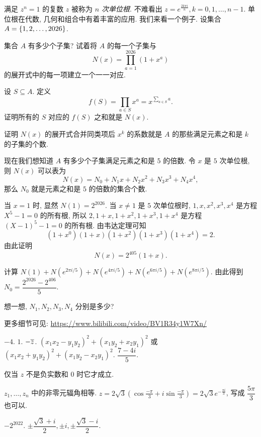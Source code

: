 \begin{homework}
    \item 满足 $z^n=1$ 的复数 $z$ 被称为 \emph{$n$ 次单位根}.
    不难看出 $z=e^{\frac{2k\pi i}n},k=0,1,\dots,n-1$.
    单位根在代数, 几何和组合中有着丰富的应用. 我们来看一个例子.
    设集合 $A={\left\{1,2,\dots,2026\right\}}$.

    \begin{exlist}
      \item 集合 $A$ 有多少个子集? 试着将 $A$ 的每一个子集与
      \[N(x)=\prod_{a=1}^{2026}(1+x^a)\]
      的展开式中的每一项建立一个一一对应.
      \item 设 $S\subseteq A$. 定义
      \[f(S)=\prod_{a\in S}x^a=x^{\sum_{a\in S}a}.\]
      证明所有的 $S$ 对应的 $f(S)$ 之和就是 $N(x)$.
      \item 证明 $N(x)$ 的展开式合并同类项后 $x^k$ 的系数就是 $A$ 的那些满足元素之和是 $k$ 的子集的个数.
      \item 现在我们想知道 $A$ 有多少个子集满足元素之和是 $5$ 的倍数.
    令 $x$ 是 $5$ 次单位根, 则 $N(x)$ 可以表为
    \[N(x)=N_0+N_1x+N_2x^2+N_3x^3+N_4x^4,\]
      那么 $N_0$ 就是元素之和是 $5$ 的倍数的集合个数.
      \item 当 $x=1$ 时, 显然 $N(1)=2^{2026}$.
      当 $x\neq 1$ 是 $5$ 次单位根时, $1,x,x^2,x^3,x^4$ 是方程 $X^5-1=0$ 的所有根, 所以 $2,1+x,1+x^2,1+x^3,1+x^4$ 是方程 $(X-1)^5-1=0$ 的所有根. 由韦达定理可知
      \[(1+x^0)(1+x)(1+x^2)(1+x^3)(1+x^4)=2.\]
      由此证明
      \[N(x)=2^{405}(1+x).\]
      \item 计算 $N(1)+N(e^{2\pi i/5})+N(e^{4\pi i/5})+N(e^{6\pi i/5})+N(e^{8\pi i/5})$. 由此得到 $N_0=\dfrac{2^{2026}-2^{406}}5$.
      \item 想一想, $N_1,N_2,N_3,N_4$ 分别是多少?
    \end{exlist}
    更多细节可见: \url{https://www.bilibili.com/video/BV1R34y1W7Xn/}
\end{homework}


\sectionExerciseAnswer

\exans $-4$.
\exans $1$.
\exans $-\overline z$.
\exans $(x_1x_2-y_1y_2)^2+(x_1y_2+x_2y_1)^2$ 或 $(x_1x_2+y_1y_2)^2+(x_1y_2-x_2y_1)^2$.
\exans $\dfrac{7-4i}5$.

\exans 仅当 $z$ 不是负实数和 $0$ 时它才成立.

\exans $z_1,\dots,z_n$ 中的非零元辐角相等.
\exans $\displaystyle z=2\sqrt3\left(\cos\frac{-\pi}3+i\sin\frac{-\pi}3\right)=2\sqrt3e^{-\frac{\pi i}3}$, 写成 $\dfrac{5\pi}3$ 也可以.

\exans $-2^{2022}$.
\exans $\pm\dfrac{\sqrt3+i}2,\pm i,\pm\dfrac{\sqrt3-i}2$.

